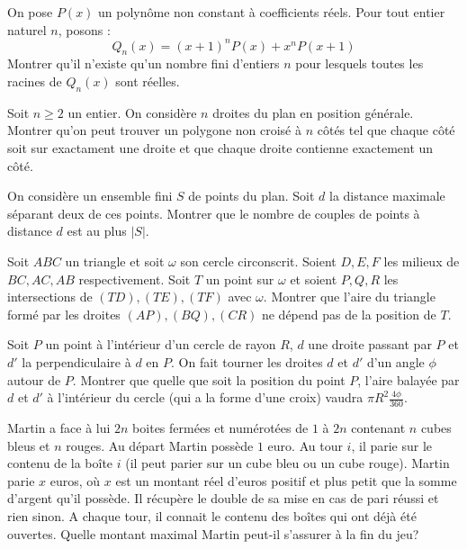 

\begin{exo}{}
On pose $P(x)$ un polynôme non constant à coefficients réels. Pour tout entier naturel $n$, posons :
$$Q_n(x) = (x+1)^nP(x) + x^nP(x+1)$$
Montrer qu'il n'existe qu'un nombre fini d'entiers $n$ pour lesquels toutes les racines de $Q_n(x)$ sont réelles.
\end{exo}


\begin{exo}{}
Soit $n\ge 2$ un entier. On considère $n$ droites du plan en position générale. Montrer qu'on peut trouver un polygone non croisé à $n$ côtés tel que chaque côté soit sur exactament une droite et que chaque droite contienne exactement un côté.
\end{exo}

\begin{exo}{}
On considère un ensemble fini $S$ de points du plan. Soit $d$ la distance maximale séparant deux de ces points. Montrer que le nombre de couples de points à distance $d$ est au plus $|S|$.
\end{exo}


\begin{exo}{}
Soit $ABC$ un triangle et soit $\omega$ son cercle circonscrit. Soient $D,E,F$ les milieux de $BC,AC,AB$ respectivement. Soit $T$ un point sur $\omega$ et soient $P,Q,R$ les intersections de $(TD),(TE),(TF)$ avec $\omega$. Montrer que l'aire du triangle formé par les droites $(AP), (BQ),(CR)$ ne dépend pas de la position de $T$.
\end{exo}


\begin{exo}{}
Soit $P$ un point à l'intérieur d'un cercle de rayon $R$, $d$ une droite passant par $P$ et $d'$ la perpendiculaire à $d$ en $P$. On fait tourner les droites $d$ et $d'$ d'un angle $\phi$ autour de $P$. Montrer que quelle que soit la position du point $P$, l'aire balayée par $d$ et $d'$ à l'intérieur du cercle (qui a la forme d'une croix) vaudra $\pi R^2 \frac{4\phi}{360}$.
\end{exo}

\begin{exo}{}
Martin a face à lui $2n$ boites fermées et numérotées de $1$ à $2n$ contenant $n$ cubes bleus et $n$ rouges. Au départ Martin possède $1$ euro. Au tour $i$, il parie sur le contenu de la boîte $i$ (il peut parier sur un cube bleu ou un cube rouge). Martin parie $x$ euros, où $x$ est un montant réel d'euros positif et plus petit que la somme d'argent qu'il possède. Il récupère le double de sa mise en cas de pari réussi et rien sinon. A chaque tour, il connait le contenu des boîtes qui ont déjà été ouvertes. Quelle montant maximal Martin peut-il s'assurer à la fin du jeu?
\end{exo}



